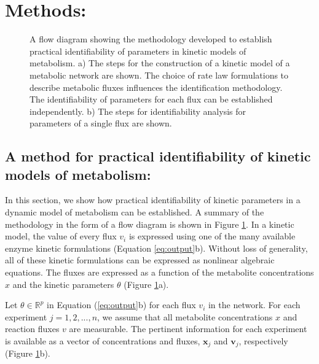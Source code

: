 \documentclass[10pt]{article}
\begin{document}
\section{Methods:}	
\begin{figure}[!tbhp]
	\caption{A flow diagram showing the methodology developed to establish practical identifiability of parameters in kinetic models of metabolism. a) The steps for the construction of a kinetic model of a metabolic network are shown. The choice of rate law formulations to describe metabolic fluxes influences the identification methodology. The identifiability of parameters for each flux can be established independently. b) The steps for identifiability analysis for parameters of a single flux are shown.}\label{fig:ident-flowchart}
\end{figure}	
\subsection{A method for practical identifiability of kinetic models of metabolism:}\label{sec:ident}
In this section, we show how practical identifiability of kinetic parameters in a dynamic model of metabolism can be established. A summary of the methodology in the form of a flow diagram is shown in Figure \ref{fig:ident-flowchart}. In a kinetic model, the value of every flux $v_i$ is expressed using one of the many available enzyme kinetic formulations (Equation \ref{eq:output}b). Without loss of generality, all of these kinetic formulations can be expressed as nonlinear algebraic equations. The fluxes are expressed as a function of the metabolite concentrations $x$ and the kinetic parameters $\theta$ (Figure \ref{fig:ident-flowchart}a). 

Let $\theta \in \mathbb{R}^p$ in Equation (\ref{eq:output}b) for each flux $v_i$ in the network. For each experiment $j = {1, 2, ..., n}$, we assume that all metabolite concentrations $x$ and reaction fluxes $v$ are measurable. The pertinent information for each experiment is available as a vector of concentrations and fluxes, $\mathbf{x}_j$ and $\mathbf{v}_j$, respectively (Figure \ref{fig:ident-flowchart}b). 
\end{document}
